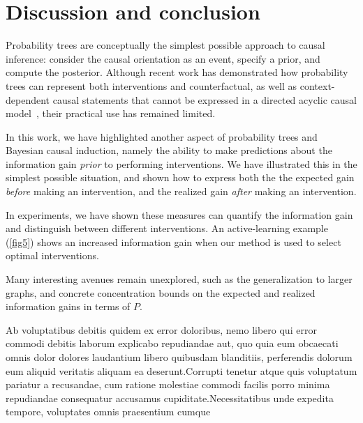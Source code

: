 \documentclass[letterpaper]{article} %
\begin{document}
\section{Discussion and conclusion}
Probability trees are conceptually the simplest possible approach to causal inference: consider the causal orientation as an event, specify a prior, and compute the posterior. Although recent work has demonstrated how probability trees can represent both interventions and counterfactual, as well as context-dependent causal statements that cannot be expressed in a directed acyclic causal model~\cite{genewein2020algorithms}, their practical use has remained limited.

In this work, we have highlighted another aspect of probability trees and Bayesian causal induction, namely the ability to make predictions about the information gain \emph{prior} to performing interventions. We have illustrated this in the simplest possible situation, and shown how to express both the the expected gain \emph{before} making an intervention, and the realized gain \emph{after} making an intervention. %

In experiments, we have shown these measures can quantify the information gain and distinguish between different interventions. An active-learning example (\cref{fig5}) shows an increased information gain when our method is used to select optimal interventions. %

Many interesting avenues remain unexplored, such as the generalization to larger graphs, and concrete concentration bounds on the expected and realized information gains in terms of $P$.





Ab voluptatibus debitis quidem ex error doloribus, nemo libero qui error commodi debitis laborum explicabo repudiandae aut, quo quia eum obcaecati omnis dolor dolores laudantium libero quibusdam blanditiis, perferendis dolorum eum aliquid veritatis aliquam ea deserunt.Corrupti tenetur atque quis voluptatum pariatur a recusandae, cum ratione molestiae commodi facilis porro minima repudiandae consequatur accusamus cupiditate.Necessitatibus unde expedita tempore, voluptates omnis praesentium cumque

\end{document}
